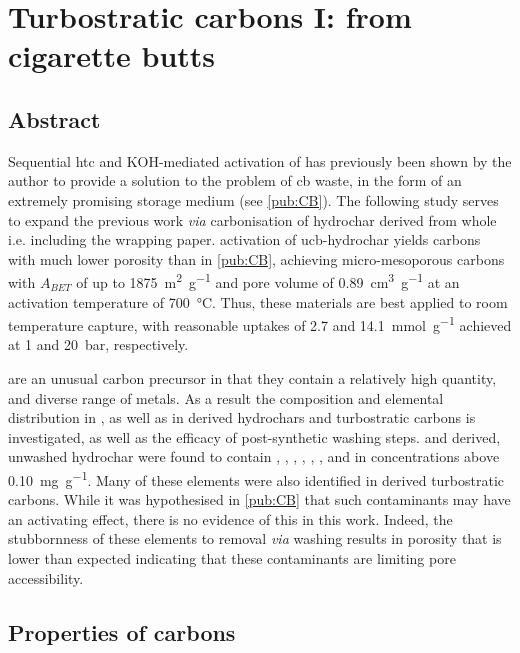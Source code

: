 \chapter{Turbostratic carbons I: from cigarette butts}
\label{ch:cbs}

\newpage
\section*{Abstract}

Sequential \gls{htc} and KOH-mediated activation of  has previously been shown by the author to provide a solution to the problem of \acrfull{cb} waste, in the form of an extremely promising  storage medium (see \ref{pub:CB}). The following study serves to expand the previous work \textit{via} carbonisation of \gls{hydrochar} derived from whole  i.e. including the wrapping paper.  activation of \acrshort{ucb}-\gls{hydrochar} yields carbons with much lower porosity than in \ref{pub:CB}, achieving micro-mesoporous carbons with $A_{BET}$ of up to \qty{1875}{\metre\squared\per\gram} and pore volume of \qty{0.89}{\cm\cubed\per\gram} at an activation temperature of \qty{700}{\degreeCelsius}. Thus, these materials are best applied to room temperature  capture, with reasonable uptakes of \num{2.7} and \qty{14.1}{\milli\mole\per\gram} achieved at 1 and \qty{20}{\bar}, respectively.

 are an unusual carbon precursor in that they contain a relatively high quantity, and diverse range of metals. As a result the composition and elemental distribution in , as well as in derived \glspl{hydrochar} and \glspl{turbostratic carbon} is investigated, as well as the efficacy of post-synthetic washing steps.  and derived, unwashed \gls{hydrochar} were found to contain , , , , , , and  in concentrations above \qty{0.10}{\mg\per\gram}. Many of these elements were also identified in derived \glspl{turbostratic carbon}. While it was hypothesised in \ref{pub:CB} that such contaminants may have an activating effect, there is no evidence of this in this work. Indeed, the stubbornness of these elements to removal \textit{via}  washing results in porosity that is lower than expected indicating that these contaminants are limiting pore accessibility.

\newpage


\section{Properties of carbons}
\label{s:cb_results}

